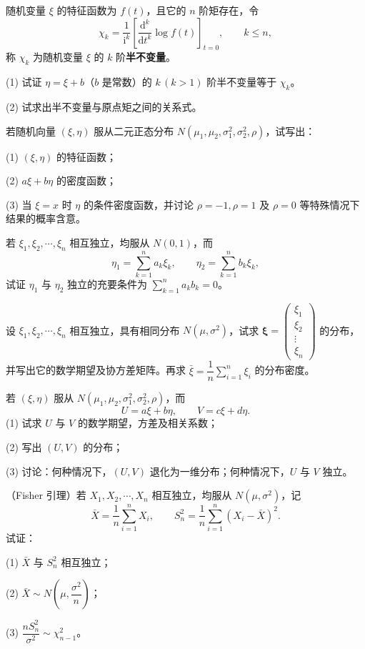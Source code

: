 \documentclass[../../main.tex]{subfiles}
\begin{document}
\begin{exercise}\label{exercise:ch04-55}
随机变量 $\xi$ 的特征函数为 $f(t)$，且它的 $n$ 阶矩存在，令
\[
\chi_k=\frac{1}{\mathrm{i}^k}\left[\frac{\mathrm{d}^k}{\mathrm{d}t^k}\log f(t)\right]_{t=0},\qquad k\leqslant n,
\]
称 $\chi_k$ 为随机变量 $\xi$ 的 $k$ 阶\textbf{半不变量}。

(1) 试证 $\eta=\xi+b$（$b$ 是常数）的 $k\,(k>1)$ 阶半不变量等于 $\chi_k$。

(2) 试求出半不变量与原点矩之间的关系式。
\end{exercise}

\begin{exercise}\label{exercise:ch04-56}
若随机向量 $(\xi,\eta)$ 服从二元正态分布 $N(\mu_1,\mu_2,\sigma_1^2,\sigma_2^2,\rho)$，试写出：

(1) $(\xi,\eta)$ 的特征函数；

(2) $a\xi+b\eta$ 的密度函数；

(3) 当 $\xi=x$ 时 $\eta$ 的条件密度函数，并讨论 $\rho=-1,\rho=1$ 及 $\rho=0$ 等特殊情况下结果的概率含意。
\end{exercise}

\begin{exercise}\label{exercise:ch04-57}
若 $\xi_1,\xi_2,\cdots,\xi_n$ 相互独立，均服从 $N(0,1)$，而
\[
\eta_1=\sum_{k=1}^n a_k\xi_k,\qquad \eta_2=\sum_{k=1}^n b_k\xi_k,
\]
试证 $\eta_1$ 与 $\eta_2$ 独立的充要条件为 $\sum_{k=1}^n a_k b_k=0$。
\end{exercise}

\begin{exercise}\label{exercise:ch04-58}
设 $\xi_1,\xi_2,\cdots,\xi_n$ 相互独立，具有相同分布 $N(\mu,\sigma^2)$，试求 $\boldsymbol{\xi}=\begin{pmatrix}\xi_1\\\xi_2\\\vdots\\\xi_n\end{pmatrix}$ 的分布，并写出它的数学期望及协方差矩阵。再求 $\bar{\xi}=\dfrac{1}{n}\sum_{i=1}^n\xi_i$ 的分布密度。
\end{exercise}

\begin{exercise}\label{exercise:ch04-59}
若 $(\xi,\eta)$ 服从 $N(\mu_1,\mu_2,\sigma_1^2,\sigma_2^2,\rho)$，而
\[
U=a\xi+b\eta,\qquad V=c\xi+d\eta.
\]
(1) 试求 $U$ 与 $V$ 的数学期望，方差及相关系数；

(2) 写出 $(U,V)$ 的分布；

(3) 讨论：何种情况下，$(U,V)$ 退化为一维分布；何种情况下，$U$ 与 $V$ 独立。
\end{exercise}

\begin{exercise}\label{exercise:ch04-60}
（Fisher 引理）若 $X_1,X_2,\cdots,X_n$ 相互独立，均服从 $N(\mu,\sigma^2)$，记
\[
\bar{X}=\frac{1}{n}\sum_{i=1}^n X_i,\qquad S_n^2=\frac{1}{n}\sum_{i=1}^n(X_i-\bar{X})^2.
\]
试证：

(1) $\bar{X}$ 与 $S_n^2$ 相互独立；

(2) $\bar{X}\sim N\left(\mu,\dfrac{\sigma^2}{n}\right)$；

(3) $\dfrac{nS_n^2}{\sigma^2}\sim\chi_{n-1}^2$。
\end{exercise}
\end{document}
